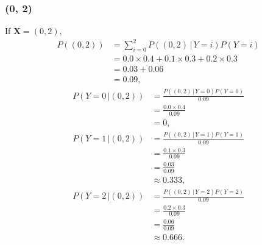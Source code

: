 \documentclass[10pt]{article}
\begin{document}
\subsubsection*{(0, 2)}
If $\textbf{X} = (0,2)$, 
\begin{align*}
P((0, 2)) &= \sum_{i = 0}^2 P((0, 2) \, | \, Y = i)P(Y = i) \\
             &= 0.0 \times 0.4 + 0.1 \times 0.3 + 0.2 \times 0.3 \\
             &= 0.03 + 0.06 \\
             &= 0.09,
\end{align*}
\begin{align*}
P(Y = 0 \, | (0,2)) &= \frac{P((0, 2) \, | \, Y = 0)P(Y = 0)}{ 0.09 } \\
                           &= \frac{0.0 \times 0.4}{ 0.09 } \\
                           &= 0,
\end{align*}
\begin{align*}
P(Y = 1 \, | (0,2)) &= \frac{P((0, 2) \, | \, Y = 1)P(Y = 1)}{ 0.09 } \\
                           &= \frac{0.1 \times 0.3}{ 0.09 } \\
                           &= \frac{ 0.03 }{ 0.09 } \\
                           &\approx 0.333,
\end{align*}
\begin{align*}
P(Y = 2 \, | (0,2)) &= \frac{P((0, 2) \, | \, Y = 2)P(Y = 2)}{ 0.09 } \\
                           &= \frac{ 0.2 \times 0.3 }{ 0.09 } \\
                           &= \frac{ 0.06 }{ 0.09 } \\
                           &\approx 0.666.
\end{align*}
\end{document}
